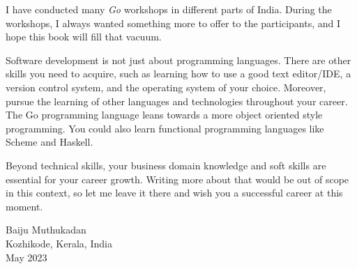 I have conducted many \textit{Go} workshops in different parts of
India.  During the workshops, I always wanted something more to offer
to the participants, and I hope this book will fill that vacuum.

Software development is not just about programming languages.  There
are other skills you need to acquire, such as learning how to use a
good text editor/IDE, a version control system, and the operating
system of your choice.  Moreover, pursue the learning of other
languages and technologies throughout your career.  The Go programming
language leans towards a more object oriented style programming.  You
could also learn functional programming languages like Scheme and
Haskell.

Beyond technical skills, your business domain knowledge and soft
skills are essential for your career growth.  Writing more about that
would be out of scope in this context, so let me leave it there and
wish you a successful career at this moment.
\thispagestyle{plain}

\vspace*{.2in}
Baiju Muthukadan\\
Kozhikode, Kerala, India\\
May 2023
